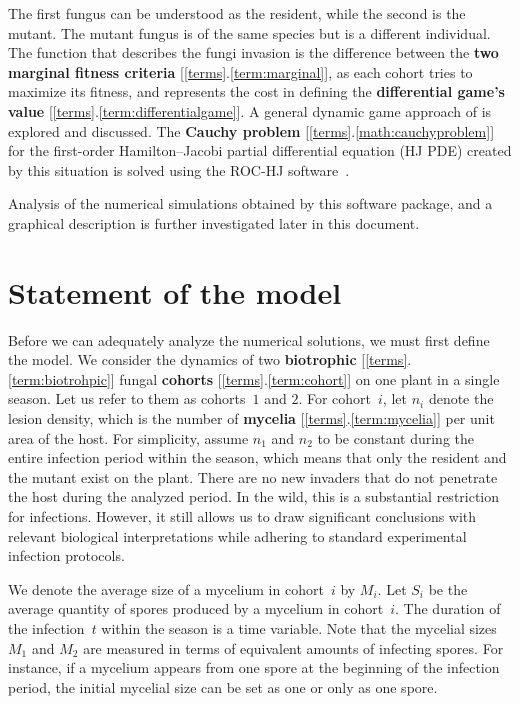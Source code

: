 \documentclass[11pt]{amsart}
\begin{document}
The first fungus can be understood as the resident, while the second is the mutant. The mutant fungus is of the same species but is a different individual.  The function that describes the fungi invasion is the difference between the \textbf{two marginal fitness criteria} [\ref{terms}.\ref{term:marginal}], as each cohort tries to maximize its fitness, and represents the cost in defining the \textbf{differential game's value} [\ref{terms}.\ref{term:differentialgame}].  A general dynamic game approach of \cite{YegorovGrognardMailleretHalkettBernhard2019} is explored and discussed. The \textbf{Cauchy problem} [\ref{terms}.\ref{math:cauchyproblem}] for the first-order Hamilton--Jacobi partial differential equation (HJ PDE) created by this situation is solved using the ROC-HJ software~\cite{ROCHJ2019}. 

Analysis of the numerical simulations obtained by this software package, and a graphical description is further investigated later in this document.


\section{Statement of the model}
Before we can adequately analyze the numerical solutions, we must first define the model. We consider the dynamics of two \textbf{biotrophic} [\ref{terms}.\ref{term:biotrohpic}] fungal \textbf{cohorts} [\ref{terms}.\ref{term:cohort}] on one plant in a single season.  Let us refer to them as cohorts~$ 1 $ and $ 2 $. For
cohort~$ i $, let $ n_i $ denote the lesion density, which is the number of \textbf{mycelia} [\ref{terms}.\ref{term:mycelia}]
per unit area of the host. For simplicity, assume $ n_1 $ and $ n_2 $ to be
constant during the entire infection period within the season, which means that
only the resident and the mutant exist on the plant. There are no new invaders that do not penetrate the host during the analyzed period.
In the wild, this is a substantial restriction for infections. However, it still allows us to draw significant conclusions with relevant
biological interpretations while adhering to standard experimental infection protocols.

We denote the average size of a mycelium in cohort~$ i $ by $ M_i $. Let $ S_i $
be the average quantity of spores produced by a mycelium in cohort~$ i $. The duration of the
infection~$ t $ within the season is a time variable. Note that the
mycelial sizes~$ M_1 $ and $ M_2 $ are measured in terms of equivalent amounts
of infecting spores. For instance, if a mycelium appears from one spore at the
beginning of the infection period, the initial mycelial size can be set as one or only as one spore.
\end{document}
